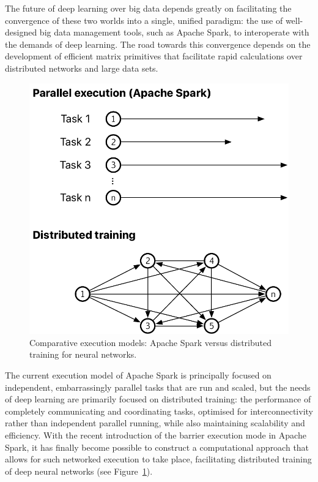 \documentclass[fleqn,10pt]{SelfArx} %
\begin{document}
The future of deep learning over big data depends greatly on facilitating the convergence of these two worlds into a single, unified paradigm: the use of well-designed big data management tools, such as Apache Spark, to interoperate with the demands of deep learning. The road towards this convergence depends on the development of efficient matrix primitives that facilitate rapid calculations over distributed networks and large data sets.

\begin{figure}
	\centering
	\includegraphics[width=\linewidth]{figures/fig1.pdf}
	\vspace{14pt}
	\caption{Comparative execution models: Apache Spark versus distributed training for neural networks.}
	\label{fig:execution-models}
\end{figure}

The current execution model of Apache Spark is principally focused on independent, embarrassingly parallel tasks that are run and scaled, but the needs of deep learning are primarily focused on distributed training: the performance of completely communicating and coordinating tasks, optimised for interconnectivity rather than independent parallel running, while also maintaining scalability and efficiency. With the recent introduction of the barrier execution mode in Apache Spark, it has finally become possible to construct a computational approach that allows for such networked execution to take place, facilitating distributed training of deep neural networks (see Figure~\ref{fig:execution-models}).
\end{document}
